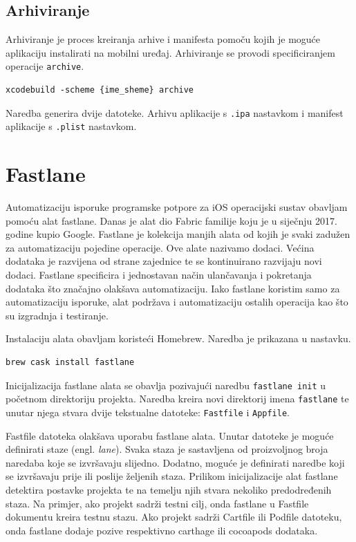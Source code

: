\documentclass[times, utf8, diplomski, numeric]{fer}
\newcommand{\eng}[1]{(engl. \textit{#1})}
\begin{document}
\begin{appendices}
\section{Arhiviranje}

Arhiviranje je proces kreiranja arhive i manifesta pomoču kojih je moguće aplikaciju instalirati na mobilni uređaj. Arhiviranje se provodi specificiranjem operacije \verb|archive|.

\begin{lstlisting}[caption=Pokretanje operaije arhiviranja korištenjem xcodebuild alata]
xcodebuild -scheme {ime_sheme} archive
\end{lstlisting}

Naredba generira dvije datoteke. Arhivu aplikacije s \verb|.ipa| nastavkom i manifest aplikacije s \verb|.plist| nastavkom.



\chapter{Fastlane} \label{header:dodatak_fastlane}

Automatizaciju isporuke programske potpore za iOS operacijski sustav obavljam pomoću alat fastlane. Danas je alat dio Fabric familije koju je u siječnju 2017. godine kupio Google. Fastlane je kolekcija manjih alata od kojih je svaki zadužen za automatizaciju pojedine operacije. Ove alate nazivamo dodaci. Većina dodataka je razvijena od strane zajednice te se kontinuirano razvijaju novi dodaci. Fastlane specificira i jednostavan način ulančavanja i pokretanja dodataka što značajno olakšava automatizaciju. Iako fastlane koristim samo za automatizaciju isporuke, alat podržava i automatizaciju ostalih operacija kao što su izgradnja i testiranje\citep{fastlane}.

Instalaciju alata obavljam koristeći Homebrew. Naredba je prikazana u nastavku.

\begin{verbatim}
brew cask install fastlane
\end{verbatim}

Inicijalizacija fastlane alata se obavlja pozivajući naredbu \verb|fastlane init| u početnom direktoriju projekta. Naredba kreira novi direktorij imena \verb|fastlane| te unutar njega stvara dvije tekstualne datoteke: \verb|Fastfile| i \verb|Appfile|.

Fastfile datoteka olakšava uporabu fastlane alata. Unutar datoteke je moguće definirati staze \eng{lane}. Svaka staza je sastavljena od proizvoljnog broja naredaba koje se izvršavaju slijedno. Dodatno, moguće je definirati naredbe koji se izvršavaju prije ili poslije željenih staza. Prilikom inicijalizacije alat fastlane detektira postavke projekta te na temelju njih stvara nekoliko predodređenih staza. Na primjer, ako projekt sadrži testni cilj, onda fastlane u Fastfile dokumentu kreira testnu stazu. Ako projekt sadrži Cartfile ili Podfile datoteku, onda fastlane dodaje pozive respektivno carthage ili cocoapods dodataka.


\end{appendices}
\end{document}
